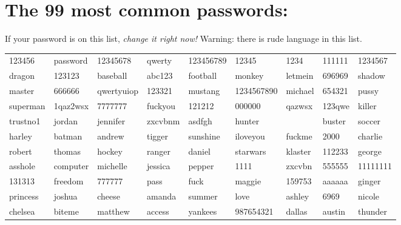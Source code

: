 \documentclass{tufte-handout}
\begin{document}
\section{The 99 most common passwords:}

If your password is on this list, \emph{change it right now!}
Warning: there is rude language in this list.

\begin{tabular}{lllllllll}

123456 & password & 12345678 & qwerty & 123456789 & 12345 & 1234 & 111111 & 1234567 \\
dragon & 123123 & baseball & abc123 & football & monkey & letmein & 696969 & shadow \\
master & 666666 & qwertyuiop & 123321 & mustang & 1234567890 & michael & 654321 & pussy \\
superman & 1qaz2wsx & 7777777 & fuckyou & 121212 & 000000 & qazwsx & 123qwe & killer \\
trustno1 & jordan & jennifer & zxcvbnm & asdfgh & hunter &  & buster & soccer \\
harley & batman & andrew & tigger & sunshine & iloveyou & fuckme & 2000 & charlie \\
robert & thomas & hockey & ranger & daniel & starwars & klaster & 112233 & george \\
asshole & computer & michelle & jessica & pepper & 1111 & zxcvbn & 555555 & 11111111 \\
131313 & freedom & 777777 & pass & fuck & maggie & 159753 & aaaaaa & ginger \\
princess & joshua & cheese & amanda & summer & love & ashley & 6969 & nicole \\
chelsea & biteme & matthew & access & yankees & 987654321 & dallas & austin & thunder \\
\end{tabular}
\end{document}
